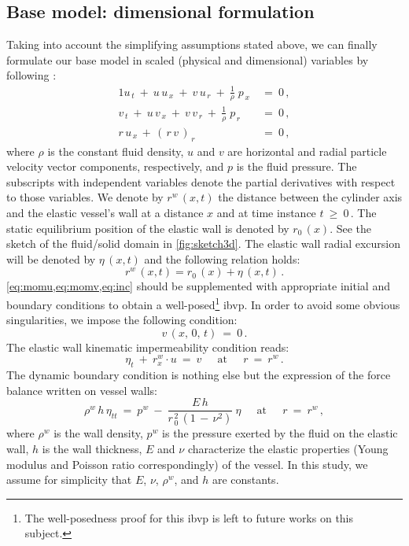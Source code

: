 \documentclass[alpha-refs, 12pt]{wiley-article}
\renewcommand{\geq}{\geqslant}
\begin{document}
\subsection{Base model: dimensional formulation}

Taking into account the simplifying assumptions stated above, we can finally formulate our base model in scaled (physical and dimensional) variables by following \cite{Mitsotakis2018, Mitsotakis2019}:
\begin{alignat}{1}
   u_{\,t}\ +\ u\,u_{\,x}\ +\ v\,u_{\,r}\ +\ \frac{1}{\rho}\;p_{\,x}\ &=\ 0\,, \label{eq:momu} \\
   v_{\,t}\ +\ u\,v_{\,x}\ +\ v\,v_{\,r}\ +\ \frac{1}{\rho}\;p_{\,r}\ &=\ 0\,, \label{eq:momv} \\
   r\,u_{\,x}\,+\,(\,r\,v\,)_{\,r}\ &=\ 0\,, \label{eq:inc}
\end{alignat}
where $\rho$ is the constant fluid density, $u$ and $v$ are horizontal and radial particle velocity vector components, respectively, and $p$ is the fluid pressure. The subscripts with independent variables denote the partial derivatives with respect to those variables. We denote by $r^{w}\,(x,t)$ the distance between the cylinder axis and the elastic vessel's wall at a distance $x$ and at time instance $t\ \geq\ 0\,$. The static equilibrium position of the elastic wall is denoted by $r_{0}\,(x)$. See the sketch of the fluid/solid domain in \cref{fig:sketch3d}. The elastic wall radial excursion will be denoted by $\eta\,(x,t)$ and the following relation holds:
\begin{equation*}
    r^{w}\,(x,t) = r_{0}\,(x) + \eta\,(x,t)\,.
\end{equation*}
\cref{eq:momu,eq:momv,eq:inc} should be supplemented with appropriate initial and boundary conditions to obtain a well-posed\footnote{The well-posedness proof for this \gls{ibvp} is left to future works on this subject.} \gls{ibvp}. In order to avoid some obvious singularities, we impose the following condition:
\begin{equation*}
    v\,(x,\,0,\,t)\ =\ 0\,.
\end{equation*}
The elastic wall kinematic impermeability condition reads:
\begin{equation*}
  \eta_{t}\ +\ r^{w}_{x}\cdot u\ =\ v\ \quad\ \mbox{at}\ \quad\ r\ =\ r^{w}\,.
\end{equation*}
The dynamic boundary condition is nothing else but the expression of the force balance written on vessel walls:
\begin{equation*}
    \rho^{w}\,h\,\eta_{tt}\ =\ p^{w}\ -\ \frac{E\,h}{r_{\,0}^{\,2}\,(1\,-\,\nu^2)}\:\eta\ \quad\ \mbox{at}\ \quad\ r\ =\ r^{w}\,,
\end{equation*}
where $\rho^{w}$ is the wall density, $p^{w}$ is the pressure exerted by the fluid on the elastic wall, $h$ is the wall thickness, $E$ and $\nu$ characterize the elastic properties (Young modulus and Poisson ratio correspondingly) of the vessel. In this study, we assume for simplicity that $E$, $\nu$, $\rho^{w}$, and $h$ are constants.
\end{document}

